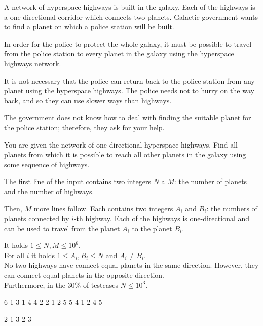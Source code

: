 





A network of hyperspace highways is built in the galaxy. Each of the highways
is a one-directional corridor which connects two planets. Galactic government
wants to find a planet on which a police station will be built.

In order for the police to protect the whole galaxy, it must be possible to
travel from the police station to every planet in the galaxy using the
hyperspace highways network.

It is not necessary that the police can return back to the police station from
any planet using the hyperspace highways. The police needs not to hurry on the
way back, and so they can use slower ways than highways.

The government does not know how to deal with finding the suitable planet for
the police station; therefore, they ask for your help.


You are given the network of one-directional hyperspace highways. Find all planets
from which it is possible to reach all other planets in the galaxy using some
sequence of highways.


The first line of the input contains two integers $N$ a $M$: the number of planets
and the number of highways.

Then, $M$ more lines follow. Each contains two integers $A_i$ and $B_i$: the numbers
of planets connected by $i$-th highway. Each of the highways is one-directional and
can be used to travel from the planet $A_i$ to the planet $B_i$.

\bigskip
\noindent
It holds $1 \leq N, M \leq 10^6$.\\
For all $i$ it holds $1 \leq A_i, B_i \leq N$ and $A_i \neq B_i$.\\
No two highways have connect equal planets in the same direction. However, they can
connect equal planets in the opposite direction.\\
Furthermore, in the $30\%$ of testcases $N \leq 10^3$.



 6
1 3
1 4
4 2
2 1
2 5
5 4
1 2 4 5
\sampleEND

 2
1 3
2 3

\sampleEND


